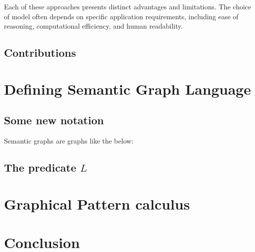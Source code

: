 \documentclass[a4paper,UKenglish,cleveref,autoref,thm-restate]{lipics-v2021}
\begin{document}
Each of these approaches presents distinct advantages and limitations. The
choice of model often depends on specific application requirements, including
ease of reasoning, computational efficiency, and human readability.

\subsection{Contributions}

\section{Defining Semantic Graph Language}

\subsection{Some new notation}

Semantic graphs are graphs like the below:


\subsection{The predicate $L$}

\section{Graphical Pattern calculus}

\section{Conclusion}

%
%
{}

\end{document}
